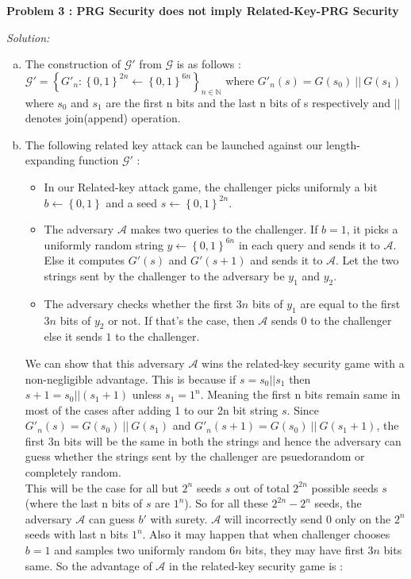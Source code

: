 \documentclass[a4paper, 11pt]{article}
\newenvironment{solution}
    {\textit{Solution:}}
    {\clearpage}
\newcommand{\prob}[1]{\begin{mdframed}[backgroundcolor=gray!20] \textbf{Problem #1}\end{mdframed}}
\newcommand{\bit}{\left\{0, 1\right\}}
\newcommand{\N}{\mathbb{N}}
\newcommand{\calA}{\mathcal{A}}
\newcommand{\calG}{\mathcal{G}}
\begin{document}
\prob{3 : PRG Security does not imply Related-Key-PRG Security}
\begin{solution}
    \begin{enumerate}[(a)]
        \item The construction of $\calG'$ from $\calG$ is as follows :\\ 
        $\calG' = \left\{ G'_n : \bit^{2n} \gets \bit^{6n} \right\}_{n \in \N }$ where $G'_n(s) = G(s_0) \:||\: G(s_1)$ where $s_0$ and $s_1$ are the first n bits and the last n bits of s respectively and $||$ denotes join(append) operation.

        \item The following related key attack can be launched against our length-expanding function $\calG'$ :
        \begin{itemize}
            \item In our Related-key attack game, the challenger picks uniformly a bit $b \gets \bit$ and a seed $s \gets \bit^{2n}$.
            \item The adversary $\calA$ makes two queries to the challenger. If $b = 1$, it picks a uniformly random string $y \gets \bit^{6n}$ in each query and sends it to $\calA$. Else it computes $G'(s)$ and $G'(s+1)$ and sends it to $\calA$. Let the two strings sent by the challenger to the adversary be $y_1$ and $y_2$.
            \item The adversary checks whether the first $3n$ bits of $y_1$ are equal to the first $3n$ bits of $y_2$ or not. If that's the case, then $\calA$ sends $0$ to the challenger else it sends $1$ to the challenger.
        \end{itemize}
        We can show that this adversary $\calA$ wins the related-key security game with a non-negligible advantage. This is because if $s = s_0 || s_1$ then $s+1 = s_0 || (s_1+1)$ unless $s_1 = 1^n$. Meaning the first n bits remain same in most of the cases after adding 1 to our 2n bit string $s$. Since $G'_n(s) = G(s_0) \:||\: G(s_1)$ and $G'_n(s+1) = G(s_0) \:||\: G(s_1+1)$, the first 3n bits will be the same in both the strings and hence the adversary can guess whether the strings sent by the challenger are psuedorandom or completely random.\\
        This will be the case for all but $2^n$ seeds $s$ out of total $2^{2n}$ possible seeds $s$ (where the last n bits of $s$ are $1^n$). So for all these $2^{2n} - 2^n$ seeds, the adversary $\calA$ can guess $b'$ with surety. $\calA$ will incorrectly send $0$ only on the $2^n$ seeds with last n bits $1^n$. Also it may happen that when challenger chooses $b=1$ and samples two uniformly random $6n$ bits, they may have first $3n$ bits same. So the advantage of $\calA$ in the related-key security game is : \\

\end{enumerate}
\end{solution}
\end{document}
